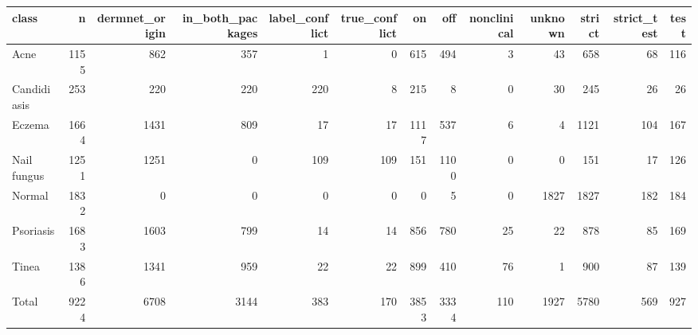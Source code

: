 \begin{tabular}{lrrrrrrrrrrrr}
\toprule
class & n & dermnet\_origin & in\_both\_packages & label\_conflict & true\_conflict & on & off & nonclinical & unknown & strict & strict\_test & test \\
\midrule
Acne & 1155 & 862 & 357 & 1 & 0 & 615 & 494 & 3 & 43 & 658 & 68 & 116 \\
Candidiasis & 253 & 220 & 220 & 220 & 8 & 215 & 8 & 0 & 30 & 245 & 26 & 26 \\
Eczema & 1664 & 1431 & 809 & 17 & 17 & 1117 & 537 & 6 & 4 & 1121 & 104 & 167 \\
Nail fungus & 1251 & 1251 & 0 & 109 & 109 & 151 & 1100 & 0 & 0 & 151 & 17 & 126 \\
Normal & 1832 & 0 & 0 & 0 & 0 & 0 & 5 & 0 & 1827 & 1827 & 182 & 184 \\
Psoriasis & 1683 & 1603 & 799 & 14 & 14 & 856 & 780 & 25 & 22 & 878 & 85 & 169 \\
Tinea & 1386 & 1341 & 959 & 22 & 22 & 899 & 410 & 76 & 1 & 900 & 87 & 139 \\
Total & 9224 & 6708 & 3144 & 383 & 170 & 3853 & 3334 & 110 & 1927 & 5780 & 569 & 927 \\
\bottomrule
\end{tabular}
